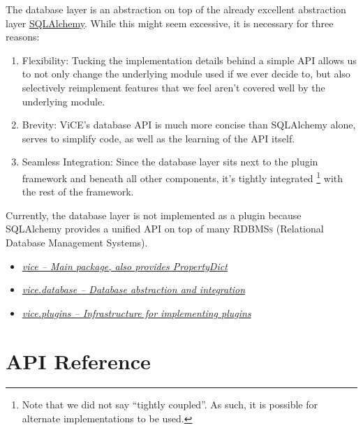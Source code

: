 \documentclass[letterpaper,10pt,english]{sphinxmanual}
\begin{document}
The database layer is an abstraction on top of
the already excellent abstraction layer \href{http://sqlalchemy.org}{SQLAlchemy}.
While this might seem excessive, it is necessary for three reasons:
\begin{enumerate}
\item {} 
Flexibility: Tucking the implementation details behind a simple API allows
us to not only change the underlying module used if we ever decide to, but
also selectively reimplement features that we feel aren't covered well by
the underlying module.

\item {} 
Brevity: ViCE's database API is much more concise than SQLAlchemy alone,
serves to simplify code, as well as the learning of the API itself.

\item {} 
Seamless Integration: Since the database layer sits next to the plugin
framework and beneath all other components, it's tightly integrated \footnote{
Note that we did not say ``tightly coupled''. As such, it is possible
for alternate implementations to be used.
}
with the rest of the framework.

\end{enumerate}

Currently, the database layer is not implemented as a plugin because
SQLAlchemy provides a unified API on top of many
\textsc{RDBMSs} (Relational Database Management Systems).



\begin{itemize}
\item {} 
{\hyperref[api_reference:vice]{\emph{vice -- Main package, also provides PropertyDict}}}

\item {} 
{\hyperref[api_reference:vice-database]{\emph{vice.database -- Database abstraction and integration}}}

\item {} 
{\hyperref[api_reference:vice-plugins]{\emph{vice.plugins -- Infrastructure for implementing plugins}}}

\end{itemize}




\chapter{API Reference}
\label{api_reference:api-reference}\label{api_reference::doc}
\end{document}
